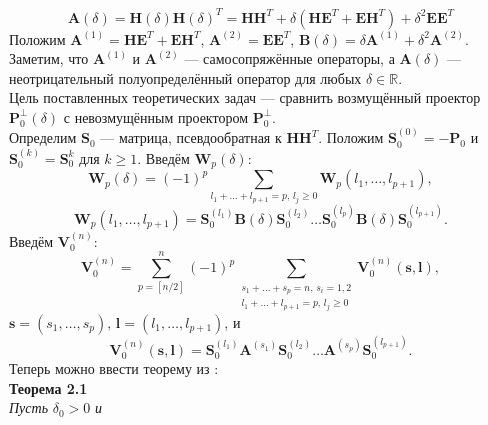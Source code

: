 \documentclass[fleqn]{article}
\newcommand\R{\mathbb{R}}
\begin{document}
	\begin{equation*}
		\textbf{A}(\delta) = \textbf{H}(\delta)\textbf{H}(\delta)^T = \textbf{H}\textbf{H}^T + \delta(\textbf{H}\textbf{E}^T + \textbf{E}\textbf{H}^T) + \delta^2\textbf{E}\textbf{E}^T
	\end{equation*}
	Положим $\textbf{A}^{(1)} = \textbf{H}\textbf{E}^T + \textbf{E}\textbf{H}^T$, $\textbf{A}^{(2)} = \textbf{E}\textbf{E}^T$, $\textbf{B}(\delta) = \delta\textbf{A}^{(1)} + \delta^2\textbf{A}^{(2)}$. Заметим, что $\textbf{A}^{(1)}$ и $\textbf{A}^{(2)}$ --- самосопряжённые операторы, а $\textbf{A}(\delta)$ --- неотрицательный полуопределённый оператор для любых $\delta\in\R$.\\
	Цель поставленных теоретических задач --- сравнить возмущённый проектор $\textbf{P}^\bot_0(\delta)$ с невозмущённым проектором $\textbf{P}^\bot_0$.\\ 
	Определим $\textbf{S}_0$ --- матрица, псевдообратная к $\textbf{H}\textbf{H}^T$. Положим $\textbf{S}_0^{(0)} = -\textbf{P}_0$ и $\textbf{S}_0^{(k)}=\textbf{S}_0^k$ для $k\geqslant1$. Введём $\textbf{W}_p(\delta)$:
	\begin{equation*}
		\textbf{W}_p(\delta) = (-1)^p\sum\limits_{l_1+\dots+l_{p+1}=p,\,l_j\geqslant0}\textbf{W}_p(l_1,\dots,l_{p+1}),
	\end{equation*}
	\begin{equation*}
		\textbf{W}_p(l_1,\dots,l_{p+1}) = \textbf{S}_0^{(l_1)}\textbf{B}(\delta)\textbf{S}_0^{(l_2)}\dots\textbf{S}_0^{(l_p)}\textbf{B}(\delta)\textbf{S}_0^{(l_{p+1})}.
	\end{equation*}
	Введём $\textbf{V}_0^{(n)}$:
	\begin{equation*}
		\textbf{V}_0^{(n)}=\sum\limits_{p=[n/2]}^n(-1)^p\sum_{\substack{
				s_1+\dots+s_p=n,\,s_i=1,2\\
				l_1+\dots+l_{p+1}=p,\,l_j\geqslant0}}
		\textbf{V}_0^{(n)}(\textbf{s},\textbf{l}),
	\end{equation*}
	$\textbf{s} = (s_1,\dots,s_p),\,\textbf{l}=(l_1,\dots,l_{p+1})$, и 
	\begin{equation*}
		\textbf{V}_0^{(n)}(\textbf{s}, \textbf{l})=\textbf{S}_0^{(l_1)}\textbf{A}^{(s_1)}\textbf{S}_0^{(l_2)}\dots\textbf{A}^{(s_p)}\textbf{S}_0^{(l_{p+1})}.
	\end{equation*}
	Теперь можно ввести теорему из \cite{nekrutkin2010perturbation}:
	\vspace*{\baselineskip}\\
	\textbf{Теорема 2.1}\\
		\emph{Пусть} $\delta_0>0$ \emph{и} 
\end{document}
